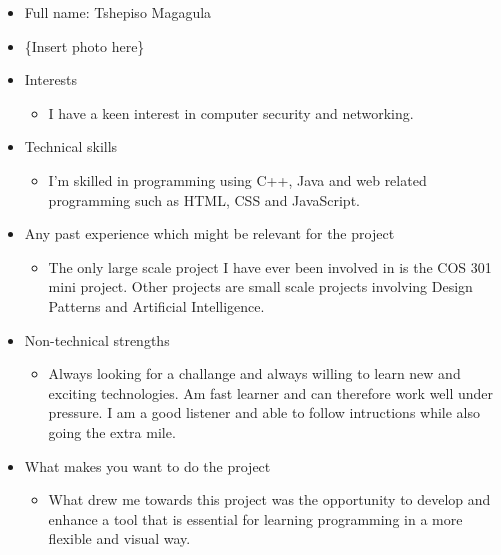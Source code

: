 
\begin{itemize}
	\item Full name: Tshepiso Magagula
	\item \{Insert photo here\}
	\item Interests
		\begin{itemize}
			\item I have a keen interest in computer security and networking.
		\end{itemize}
	\item Technical skills
		\begin{itemize}
			\item I'm skilled in programming using C++, Java and web related 
			programming such as HTML, CSS and JavaScript.
		\end{itemize}
	\item Any past experience which might be relevant for the project
		\begin{itemize}
			\item The only large scale project I have ever been involved in is the 				COS 301 mini project. Other projects are small scale projects involving 			Design Patterns and Artificial Intelligence.
		\end{itemize}
	\item Non-technical strengths
		\begin{itemize}
			\item Always looking for a challange and always willing to learn new 
			and exciting technologies. Am fast learner and can therefore work well under pressure. I am
			 a good listener and able to follow intructions while also going the extra mile. 
		\end{itemize}
	\item What makes you want to do the project
		\begin{itemize}
			\item What drew me towards this project was the opportunity to develop and enhance a 
			tool that is essential for learning programming in a more flexible and visual way.
		\end{itemize}



\end{itemize}
